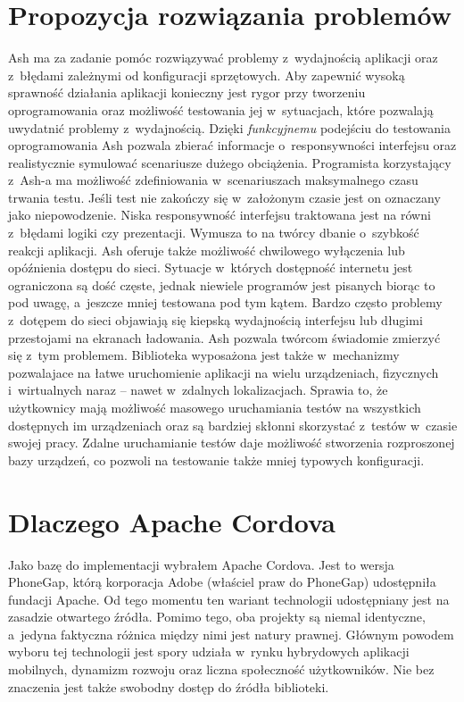 \documentclass[brudnopis]{xmgr}
\begin{document}
\section{Propozycja rozwiązania problemów}
Ash ma za zadanie pomóc rozwiązywać problemy z~wydajnością aplikacji oraz z~błędami zależnymi od konfiguracji sprzętowych. Aby
zapewnić wysoką sprawność działania aplikacji konieczny jest rygor przy tworzeniu
oprogramowania oraz możliwość testowania jej w~sytuacjach, które pozwalają
uwydatnić problemy z~wydajnością. Dzięki \textit{funkcyjnemu} podejściu do testowania
oprogramowania Ash pozwala zbierać informacje o~responsywności interfejsu
oraz realistycznie symulować scenariusze dużego obciążenia. Programista
korzystający z~Ash-a ma możliwość zdefiniowania w~scenariuszach maksymalnego
czasu trwania testu. Jeśli test nie zakończy się w~założonym czasie jest on oznaczany jako niepowodzenie. Niska responsywność interfejsu traktowana jest na równi z~błędami
logiki czy prezentacji. Wymusza to na twórcy dbanie o~szybkość reakcji aplikacji.
Ash oferuje także możliwość chwilowego wyłączenia lub opóźnienia dostępu do
sieci. Sytuacje w~których dostępność internetu jest ograniczona są dość częste,
jednak niewiele programów jest pisanych biorąc to pod uwagę, a~jeszcze mniej 
testowana pod tym kątem. Bardzo często problemy z~dotępem do sieci objawiają się kiepską
wydajnością interfejsu lub długimi przestojami na ekranach ładowania. Ash pozwala
twórcom świadomie zmierzyć się z~tym problemem. Biblioteka wyposażona jest także w~mechanizmy pozwalajace na łatwe uruchomienie aplikacji na wielu urządzeniach, fizycznych i~wirtualnych naraz -- nawet w~zdalnych lokalizacjach. Sprawia to, że
użytkownicy mają możliwość masowego uruchamiania testów na wszystkich
dostępnych im urządzeniach oraz są bardziej skłonni skorzystać z~testów w~czasie
swojej pracy. Zdalne uruchamianie testów daje możliwość stworzenia
rozproszonej bazy urządzeń, co pozwoli na testowanie także mniej typowych
konfiguracji.

\section{Dlaczego Apache Cordova}
Jako bazę do implementacji wybrałem Apache Cordova. Jest to
wersja PhoneGap, którą korporacja Adobe (właściel praw do PhoneGap) udostępniła
fundacji Apache. Od tego momentu ten wariant technologii udostępniany jest
na zasadzie otwartego źródła. Pomimo tego, oba projekty są niemal identyczne, a~jedyna faktyczna różnica między nimi jest natury prawnej. Głównym powodem
wyboru tej technologii jest spory udziała w~rynku hybrydowych aplikacji mobilnych,
dynamizm rozwoju oraz liczna społeczność użytkowników. Nie bez znaczenia jest także swobodny dostęp do źródła biblioteki.
\end{document}

